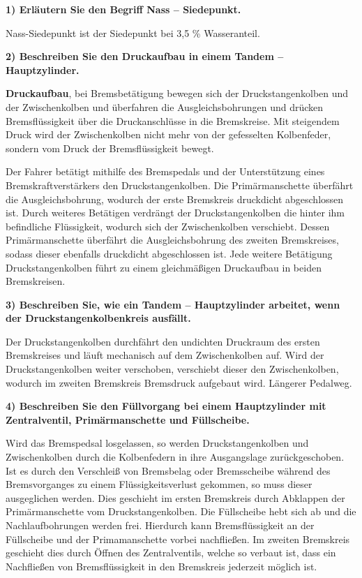 \textbf{1) Erläutern Sie den Begriff Nass -- Siedepunkt.}

Nass-Siedepunkt ist der Siedepunkt bei 3,5 \% Wasseranteil.

\textbf{2) Beschreiben Sie den Druckaufbau in einem Tandem --
Hauptzylinder.}

\textbf{Druckaufbau}, bei Bremsbetätigung bewegen sich der
Druckstangenkolben und der Zwischenkolben und überfahren die
Ausgleichsbohrungen und drücken Bremsflüssigkeit über die
Druckanschlüsse in die Bremskreise. Mit steigendem Druck wird der
Zwischenkolben nicht mehr von der gefesselten Kolbenfeder, sondern vom
Druck der Bremsflüssigkeit bewegt.

Der Fahrer betätigt mithilfe des Bremspedals und der Unterstützung eines
Bremskraftverstärkers den Druckstangenkolben. Die Primärmanschette
überfährt die Ausgleichsbohrung, wodurch der erste Bremskreis druckdicht
abgeschlossen ist. Durch weiteres Betätigen verdrängt der
Druckstangenkolben die hinter ihm befindliche Flüssigkeit, wodurch sich
der Zwischenkolben verschiebt. Dessen Primärmanschette überfährt die
Ausgleichsbohrung des zweiten Bremskreises, sodass dieser ebenfalls
druckdicht abgeschlossen ist. Jede weitere Betätigung Druckstangenkolben
führt zu einem gleichmäßigen Druckaufbau in beiden Bremskreisen.

\textbf{3) Beschreiben Sie, wie ein Tandem -- Hauptzylinder arbeitet,
wenn der Druckstangenkolbenkreis ausfällt.}

Der Druckstangenkolben durchfährt den undichten Druckraum des ersten
Bremskreises und läuft mechanisch auf dem Zwischenkolben auf. Wird der
Druckstangenkolben weiter verschoben, verschiebt dieser den
Zwischenkolben, wodurch im zweiten Bremskreis Bremsdruck aufgebaut wird.
Längerer Pedalweg.

\textbf{4) Beschreiben Sie den Füllvorgang bei einem Hauptzylinder mit
Zentralventil, Primärmanschette und Füllscheibe.}

Wird das Bremspedsal losgelassen, so werden Druckstangenkolben und
Zwischenkolben durch die Kolbenfedern in ihre Ausgangslage
zurückgeschoben. Ist es durch den Verschleiß von Bremsbelag oder
Bremsscheibe während des Bremsvorganges zu einem Flüssigkeitsverlust
gekommen, so muss dieser ausgeglichen werden. Dies geschieht im ersten
Bremskreis durch Abklappen der Primärmanschette vom Druckstangenkolben.
Die Füllscheibe hebt sich ab und die Nachlaufbohrungen werden frei.
Hierdurch kann Bremsflüssigkeit an der Füllscheibe und der
Primamanschette vorbei nachfließen. Im zweiten Bremskreis geschieht dies
durch Öffnen des Zentralventils, welche so verbaut ist, dass ein
Nachfließen von Bremsflüssigkeit in den Bremskreis jederzeit möglich
ist.

